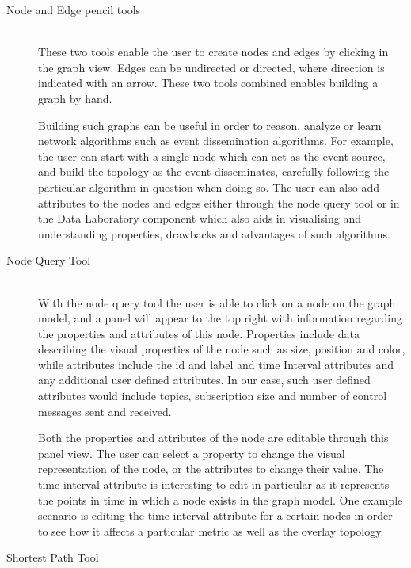 \begin{description}

\item[Node and Edge pencil tools] \hfill \\

    These two tools enable the user to create nodes and edges by
    clicking in the graph view. Edges can be undirected or directed,
    where direction is indicated with an arrow. These two tools combined
    enables building a graph by hand.

    Building such graphs can be useful in order to reason, analyze or
    learn network algorithms such as event dissemination algorithms.
    For example, the user can start with a single node which can act as
    the event source, and build the topology as the event disseminates,
    carefully following the particular algorithm in question when doing
    so. The user can also add attributes to the nodes and edges either
    through the node query tool or in the Data Laboratory component
    which also aids in visualising and understanding properties,
    drawbacks and advantages of such algorithms.

\item[Node Query Tool] \hfill \\

    With the node query tool the user is able to click on a node on the
    graph model, and a panel will appear to the top right with information
    regarding the properties and attributes of this node. Properties include
    data describing the visual properties of the node such as size, position
    and color, while attributes include the id and label and time Interval
    attributes and any additional user defined attributes. In our case, such
    user defined attributes would include topics, subscription size and
    number of control messages sent and received.

    Both the properties and attributes of the node are editable through this
    panel view. The user can select a property to change the visual
    representation of the node, or the attributes to change their value. The
    time interval attribute is interesting to edit in particular as it
    represents the points in time in which a node exists in the graph model.
    One example scenario is editing the time interval attribute for a certain
    nodes in order to see how it affects a particular metric as well as the
    overlay topology.

\item[Shortest Path Tool] \hfill \\


\end{description}
